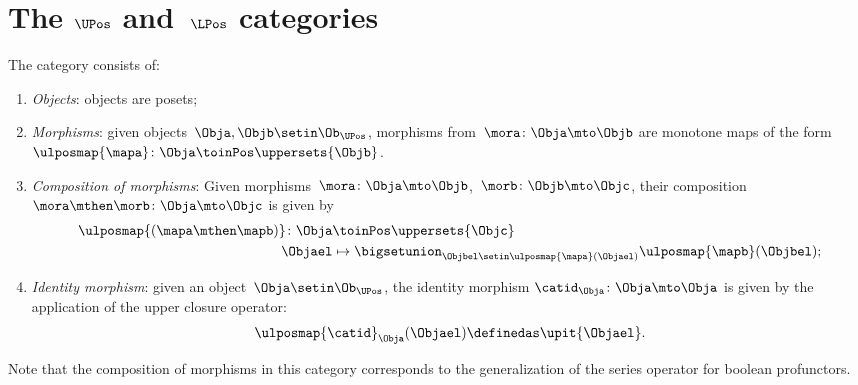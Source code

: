 
\section{The $\UPos$ and~$\LPos$ categories}

\begin{definition}
    \label{def:upos_cat}
    The category \UPos consists of:
    \begin{enumerate}
        \item \emph{Objects}: objects are posets;
        \item \emph{Morphisms}: given objects~$\Obja,\Objb\setin \Ob_{\UPos}$, morphisms from~$\mora\colon \Obja \mto \Objb$ are monotone maps of the form~$\ulposmap{\mapa} \colon \Obja \toinPos \uppersets{\Objb}$.
        \item \emph{Composition of morphisms}: Given morphisms~$\mora\colon \Obja \mto \Objb$,~$\morb\colon \Objb\mto \Objc$, their composition~$\mora\mthen \morb\colon \Obja\mto \Objc$ is given by
              \begin{equation}
                  \begin{aligned}
                      \ulposmap{(\mapa \mthen \mapb)} \colon \Obja & \toinPos \uppersets{\Objc} \\
                      \Objael                                      & \mapsto \bigsetunion_{\Objbel\setin \ulposmap{\mapa}(\Objael)}\ulposmap{\mapb}(\Objbel);
                  \end{aligned}
              \end{equation}
        \item \emph{Identity morphism}: given an object~$\Obja\setin \Ob_{\UPos}$, the identity morphism $\catid_\Obja \colon \Obja \mto \Obja$ is given by the application of the upper closure operator:
              \begin{equation}
                  \ulposmap{\catid}_\Obja(\Objael)\definedas \upit\{\Objael\}.
              \end{equation}
    \end{enumerate}
\end{definition}

\begin{remark}
    Note that the composition of morphisms in this category corresponds to the generalization of the series operator for boolean profunctors.
\end{remark}

